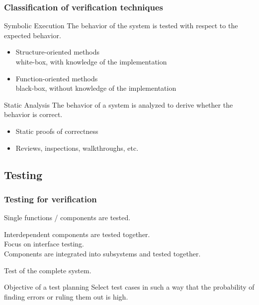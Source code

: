 \begin{frame}
\frametitle{Classification of verification techniques}

\begin{block}{Symbolic Execution}
The behavior of the system is tested with respect to the expected behavior.
\begin{itemize}
  \item Structure-oriented methods\\
        white-box, with knowledge of the implementation 
  \item Function-oriented methods\\
        black-box, without knowledge of the implementation
\end{itemize}
\end{block}
 
\vspace{1ex}
\begin{block}{Static Analysis}
The behavior of a system is analyzed to derive whether the behavior is correct.
\begin{itemize}
  \item Static proofs of correctness
  \item Reviews, inspections, walkthroughs, etc.
\end{itemize}
\end{block}
\end{frame}

\subsection{Testing}

\begin{frame}
\frametitle{Testing for verification}
\begin{description}
  \item[Unit-Test]
  Single functions / components are tested.
  \item[Integration test]
  Interdependent components are tested together.\\
            Focus on interface testing.\\
        Components are integrated into subsystems and tested together.
  \item[System test]
  Test of the complete system.
\end{description}  
\begin{block}{Objective of a test planning}
Select test cases in such a way that the probability of finding errors or ruling them out is high.
\end{block}
\end{frame}

